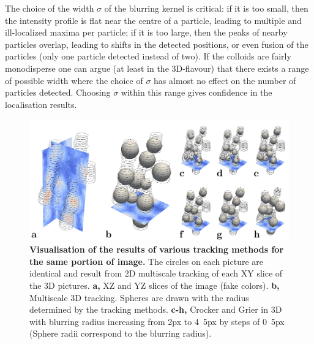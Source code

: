 \documentclass[prl,twocolumn,notitlepage]{revtex4-1}
\begin{document}
The choice of the width $\sigma$ of the blurring kernel is critical: if it is too small, then the intensity profile is flat near the centre  of a particle, leading to multiple and ill-localized maxima per particle; if it is too large, then the peaks of nearby particles overlap, leading to shifts in the detected positions, or even fusion of the particles (only one particle detected instead of two). If the colloids are fairly monodisperse one can argue (at least in the 3D-flavour) that there exists a range of possible width where the choice of $\sigma$ has almost no effect on the number of particles detected. Choosing $\sigma$ within this range gives confidence in the localisation results.

\begin{figure}
\begin{center}
\includegraphics{generate_figures-figure5.pdf}
\end{center}
\caption{\textbf{Visualisation of the results of various tracking methods for the same portion of image.} The circles on each picture are identical and result from 2D multiscale tracking of each XY slice of the 3D pictures. \textbf{a,} XZ and YZ slices of the image (fake colors). \textbf{b,} Multiscale 3D tracking. Spheres are drawn with the radius determined by the tracking methods. \textbf{c-h,} Crocker and Grier in 3D with blurring radius increasing from \unit{2}{px} to \unit{4.5}{px} by steps of \unit{0.5}{px} (Sphere radii correspond to the blurring radius).}
	\label{fig:localise}
\end{figure}
\end{document}
